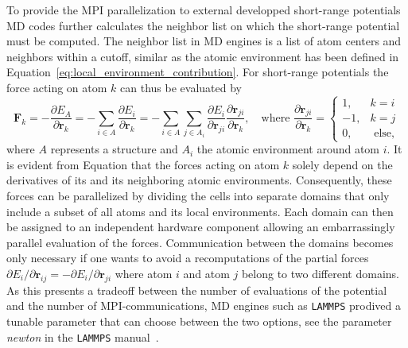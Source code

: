 To provide the MPI parallelization to external developped short-range potentials MD codes further calculates the neighbor list on which the short-range potential must be computed.
The neighbor list in MD engines is a list of atom centers and neighbors within a cutoff, similar as the atomic environment has been defined in Equation~\eqref{eq:local_environment_contribution}.
For short-range potentials the force acting on atom $k$ can thus be evaluated by 
\begin{equation}
  \label{eq:forces_interatomic_potential}
  \mathbf{F}_k =  -\frac{\partial E_A}{\partial\mathbf{r}_k}
  = -\sum_{i\in A} \frac{\partial E_i}{\partial\mathbf{r}_k}
  = -\sum_{i\in A}\sum_{j\in A_i} \frac{\partial E_i}{\partial\mathbf{r}_{ji}} \frac{\partial\mathbf{r}_{ji}}{\partial\mathbf{r}_k}
   ,\quad\textrm{where }\frac{\partial\mathbf{r}_{ji}}{\partial\mathbf{r}_k} = \begin{cases}1,& k=i \\ -1,& k=j \\0,& \textrm{ else,} \end{cases}
\end{equation}
where $A$ represents a structure and $A_i$ the atomic environment around atom $i$.
It is evident from Equation that the forces acting on atom $k$ solely depend on the derivatives of its and its neighboring atomic environments.
Consequently, these forces can be parallelized by dividing the cells into separate domains that only include a subset of all atoms and its local environments.
Each domain can then be assigned to an independent hardware component allowing an embarrassingly parallel evaluation of the forces.
Communication between the domains becomes only necessary if one wants to avoid a recomputations of the partial forces $\partial E_i/\partial\mathbf{r}_{ij}=-\partial E_i/\partial\mathbf{r}_{ji}$ where atom $i$ and atom $j$ belong to two different domains.
As this presents a tradeoff between the number of evaluations of the potential and the number of MPI-communications, MD engines such as \texttt{LAMMPS} prodived a tunable parameter that can choose between the two options, see the parameter \emph{newton} in the \texttt{LAMMPS} manual~\cite{lammpsnewton}.
